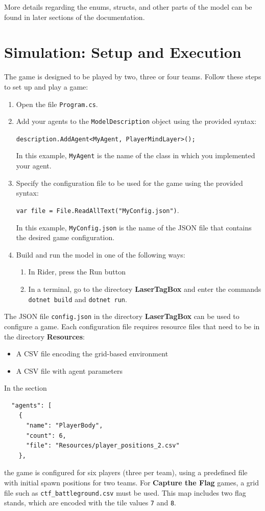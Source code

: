 \documentclass[a4paper,english,DIV=16,11pt,parskip=half,dvipsnames,listof=totoc,index=totoc,bibliography=totoc]{scrartcl}
\begin{document}
More details regarding the enums, structs, and other parts of the model can be found in later sections of the documentation.
%
\section{Simulation: Setup and Execution} \label{sec:simSetup}
%
The game is designed to be played by two, three or four teams. Follow these steps to set up and play a game:
\begin{enumerate}
  \item Open the file \texttt{Program.cs}.
  \item Add your agents to the \texttt{ModelDescription} object using the provided syntax:%
  \begin{center}
    \texttt{description.AddAgent<MyAgent, PlayerMindLayer>();}
  \end{center}%
  In this example, \texttt{MyAgent} is the name of the class in which you implemented your agent.
  \item Specify the configuration file to be used for the game using the provided syntax:%
  \begin{center}
    \texttt{var file = File.ReadAllText("MyConfig.json")}.
  \end{center}%
  In this example, \texttt{MyConfig.json} is the name of the JSON file that contains the desired game configuration.
  \item Build and run the model in one of the following ways:%
  \begin{enumerate}
    \item In Rider, press the \textcolor{OliveGreen}{\Forward} Run button
    \item In a terminal, go to the directory \textbf{LaserTagBox} and enter the commands \texttt{dotnet build} and \texttt{dotnet run}.
  \end{enumerate}%
\end{enumerate}
%
The JSON file \texttt{config.json} in the directory \textbf{LaserTagBox} can be used to configure a game. Each configuration file requires resource files that need to be in the directory \textbf{Resources}:%
%
\begin{itemize}
  \item A CSV file encoding the grid-based environment
  \item A CSV file with agent parameters
\end{itemize}

In the section
\begin{lstlisting}
  "agents": [
    {
      "name": "PlayerBody",
      "count": 6,
      "file": "Resources/player_positions_2.csv"
    },
\end{lstlisting}
the game is configured for six players (three per team), using a predefined file with initial spawn positions for two teams. For \textbf{Capture the Flag} games, a grid file such as \texttt{ctf\_battleground.csv} must be used. This map includes two flag stands, which are encoded with the tile values \texttt{7} and \texttt{8}.
\end{document}

